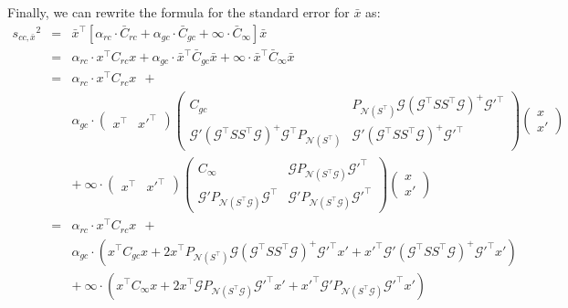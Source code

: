 \documentclass[11pt]{article}
\newcommand{\Gmat}{\mathcal{G}}
\newcommand{\PNmat}[1]{P_{\mathcal{N}\left(#1\right)}}
\begin{document}
Finally, we can rewrite the formula for the standard error for $\bar{x}$ as:
\begin{eqnarray}
{s_{cc,\bar{x}}}^2
&=& 
\bar{x}^{\top} \left[ \alpha_{rc}\cdot \bar{C}_{rc} + \alpha_{gc}\cdot \bar{C}_{gc} + \infty\cdot \bar{C}_{\infty}  \right] \bar{x}
\nonumber\\ &=&
\alpha_{rc} \cdot x^{\top} C_{rc} x + \alpha_{gc} \cdot \bar{x}^{\top} \bar{C}_{gc} \bar{x} + \infty \cdot \bar{x}^{\top} \bar{C}_{\infty} \bar{x}
\nonumber\\ &=&
\alpha_{rc} \cdot x^{\top} C_{rc} x ~~+
\nonumber\\ &&
\alpha_{gc} \cdot \left( \begin{array}{c|c} x^\top & x'^\top \end{array} \right)
\left( \begin{array}{c|c}
		C_{gc} &
		\PNmat{S^\top} \Gmat \left(\Gmat^{\top}SS^{\top}\Gmat\right)^{+} \Gmat'^\top \\ \hline
		\Gmat' \left(\Gmat^{\top}SS^{\top}\Gmat\right)^{+} \Gmat^\top \PNmat{S^\top} &
		\Gmat'\left(\Gmat^{\top}SS^{\top}\Gmat\right)^{+} \Gmat'^\top
	\end{array} \right)
 \left( \begin{array}{c} x \\ \hline x' \end{array} \right)
\nonumber\\ &&+~
\infty \cdot \left( \begin{array}{c|c} x^\top & x'^\top \end{array} \right)
\left( \begin{array}{c|c}
		C_\infty &
		\Gmat \PNmat{S^\top\Gmat} \Gmat'^\top \\ \hline
		\Gmat' \PNmat{S^\top\Gmat} \Gmat^\top &
		\Gmat' \PNmat{S^\top\Gmat} \Gmat'^\top
 \end{array}\right) \left( \begin{array}{c} x \\ \hline x' \end{array} \right)
\nonumber\\ &=&
\alpha_{rc} \cdot x^{\top} C_{rc} x ~~+
\nonumber\\ &&
\alpha_{gc} \cdot \left(
	x^\top C_{gc} x +
	2 x^\top \PNmat{S^\top} \Gmat \left(\Gmat^{\top}SS^{\top}\Gmat\right)^{+} \Gmat'^\top x' +
	x'^\top \Gmat'\left(\Gmat^{\top}SS^{\top}\Gmat\right)^{+} \Gmat'^\top x'
\right)
\nonumber\\ &&+~
\infty \cdot \left(
	x^\top C_{\infty} x +
	2 x^\top \Gmat \PNmat{S^\top\Gmat} \Gmat'^\top x' +
	x'^\top \Gmat' \PNmat{S^\top\Gmat} \Gmat'^\top x'
\right)
\end{eqnarray}
\end{document}
